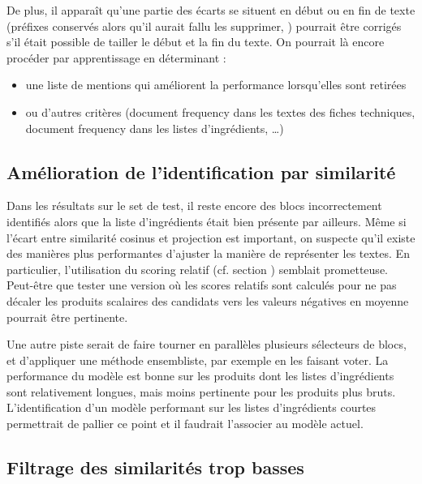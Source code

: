     De plus, il apparaît qu'une partie des écarts se situent en début ou en fin de texte (préfixes conservés alors qu'il aurait fallu les supprimer, )
    pourrait être corrigés s'il était possible de \og tailler \fg le début et la fin du texte.
    On pourrait là encore procéder par apprentissage en déterminant : 
    \begin{itemize}
        \item une liste de mentions qui améliorent la performance lorsqu'elles sont retirées
        \item ou d'autres critères (document frequency dans les textes des fiches techniques, document frequency dans les listes d'ingrédients, \dots)
    \end{itemize}

    \subsection{Amélioration de l'identification par similarité}

    Dans les résultats sur le set de test, il reste encore des blocs incorrectement identifiés alors que la liste d'ingrédients était bien présente par ailleurs.
    Même si l'écart entre similarité cosinus et projection est important, on suspecte qu'il existe des manières plus performantes d'ajuster la manière de représenter les textes.
    En particulier, l'utilisation du scoring relatif (cf. section ) semblait prometteuse.
    Peut-être que tester une version où les scores relatifs sont calculés pour ne pas décaler les produits scalaires des candidats vers les valeurs négatives en moyenne pourrait être pertinente.

    Une autre piste serait de faire tourner en parallèles plusieurs sélecteurs de blocs, et d'appliquer une méthode ensembliste, par exemple en les faisant voter.
    La performance du modèle est bonne sur les produits dont les listes d'ingrédients sont relativement longues, mais moins pertinente pour les produits plus bruts.
    L'identification d'un modèle performant sur les listes d'ingrédients courtes permettrait de pallier ce point et il faudrait l'associer au modèle actuel.

    \subsection{Filtrage des similarités trop basses}
    
